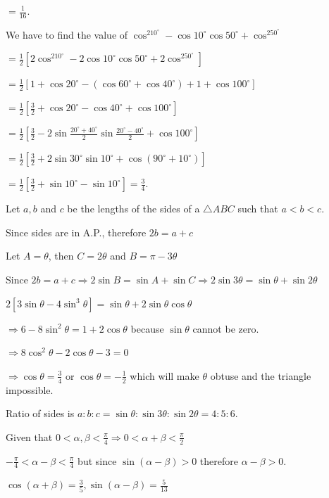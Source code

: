   $= \frac{1}{16}$.
\item We have to find the value of $\cos^210^\circ - \cos10^\circ\cos50^\circ + \cos^250^\circ$

  $= \frac{1}{2}\left[2\cos^210^\circ - 2\cos10^\circ\cos50^\circ + 2\cos^250^\circ\right]$

  $= \frac{1}{2}\left[1 + \cos20^\circ - (\cos60^\circ + \cos40^\circ) + 1 + \cos100^\circ\right]$

  $= \frac{1}{2}\left[\frac{3}{2} + \cos20^\circ - \cos40^\circ + \cos100^\circ\right]$

  $= \frac{1}{2}\left[\frac{3}{2} - 2\sin\frac{20^\circ + 40^\circ}{2}\sin\frac{20^\circ - 40^\circ}{2}
  + \cos100^\circ\right]$

  $= \frac{1}{2}\left[\frac{3}{2} + 2\sin30^\circ\sin10^\circ + \cos\left(90^\circ + 10^\circ\right)\right]$

  $= \frac{1}{2}\left[\frac{3}{2} + \sin10^\circ - \sin10^\circ\right] = \frac{3}{4}$.
\item Let $a, b$ and $c$ be the lengths of the sides of a $\triangle ABC$ such that $a < b < c$.

  Since sides are in A.P., therefore $2b = a + c$

  Let $A = \theta$, then $C = 2\theta$ and $B = \pi - 3\theta$

  Since $2b = a + c \Rightarrow 2\sin B = \sin A + \sin C \Rightarrow 2\sin3\theta = \sin\theta
  + \sin2\theta$

  $2\left[3\sin\theta - 4\sin^3\theta\right] = \sin\theta + 2\sin\theta\cos\theta$

  $\Rightarrow 6 - 8\sin^2\theta = 1 + 2\cos\theta$ because $\sin\theta$ cannot be zero.

  $\Rightarrow 8\cos^2\theta - 2 \cos\theta - 3 = 0$

  $\Rightarrow \cos\theta = \frac{3}{4}$ or $\cos\theta = -\frac{1}{2}$ which will make $\theta$ obtuse and
  the triangle impossible.

  Ratio of sides is $a:b:c = \sin \theta:\sin3\theta:\sin2\theta = 4:5:6$.
\item Given that $0 < \alpha, \beta < \frac{\pi}{4}\Rightarrow 0 < \alpha + \beta < \frac{\pi}{2}$

  $-\frac{\pi}{4} < \alpha - \beta < \frac{\pi}{4}$ but since $\sin(\alpha - \beta) > 0$ therefore $\alpha -
  \beta > 0$.

  $\cos(\alpha + \beta) = \frac{3}{5}, \sin(\alpha - \beta) = \frac{5}{13}$

